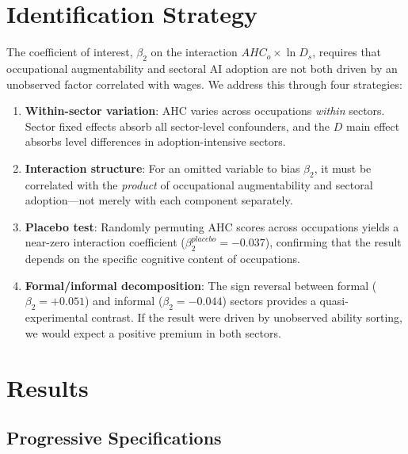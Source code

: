 \documentclass[a4paper,fleqn]{cas-dc}
\begin{document}
\section{Identification Strategy}
\label{sec:identification}

The coefficient of interest, $\beta_2$ on the interaction $AHC_o \times \ln D_s$, requires that occupational augmentability and sectoral AI adoption are not both driven by an unobserved factor correlated with wages. We address this through four strategies:

\begin{enumerate}
\item \textbf{Within-sector variation}: AHC varies across occupations \textit{within} sectors. Sector fixed effects absorb all sector-level confounders, and the $D$ main effect absorbs level differences in adoption-intensive sectors.

\item \textbf{Interaction structure}: For an omitted variable to bias $\beta_2$, it must be correlated with the \textit{product} of occupational augmentability and sectoral adoption---not merely with each component separately.

\item \textbf{Placebo test}: Randomly permuting AHC scores across occupations yields a near-zero interaction coefficient ($\beta_2^{placebo} = -0.037$), confirming that the result depends on the specific cognitive content of occupations.

\item \textbf{Formal/informal decomposition}: The sign reversal between formal ($\beta_2 = +0.051$) and informal ($\beta_2 = -0.044$) sectors provides a quasi-experimental contrast. If the result were driven by unobserved ability sorting, we would expect a positive premium in both sectors.
\end{enumerate}


\section{Results}
\label{sec:results}

\subsection{Progressive Specifications}
\end{document}
